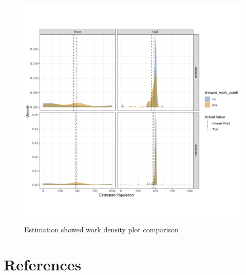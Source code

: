 \documentclass[print]{nuthesis}
\begin{document}
\begin{figure}[tbp]

{\centering \includegraphics[width=1\linewidth,]{thesis_files/figure-latex/unnamed-chunk-2-1} 

}

\caption{Estimation showed work density plot comparison}\label{fig:unnamed-chunk-2}
\end{figure}

\backmatter

\hypertarget{references}{%
\chapter*{References}\label{references}}

\noindent

\setlength{\parindent}{-0.20in}
\setlength{\leftskip}{0.20in}
\setlength{\parskip}{8pt}
\end{document}
